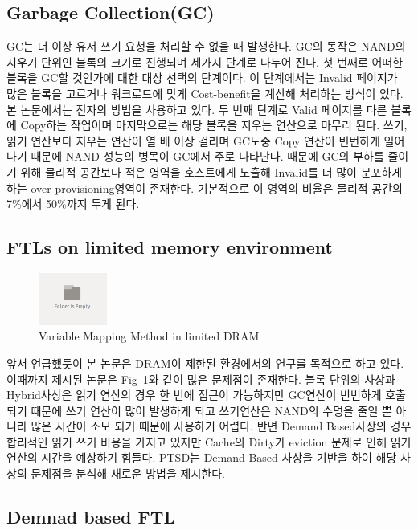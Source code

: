 \documentclass[conference]{IEEEtran}
\begin{document}
\subsection{Garbage Collection(GC)}
GC는 더 이상 유저 쓰기 요청을 처리할 수 없을 때 발생한다. GC의 동작은 NAND의 지우기 단위인 블록의 크기로 진행되며 세가지 단계로 나누어 진다. 첫 번째로 어떠한 블록을 GC할 것인가에 대한 대상 선택의 단계이다. 이 단계에서는 Invalid 페이지가 많은 블록을 고르거나 워크로드에 맞게 Cost-benefit을 계산해 처리하는 방식이 있다. 본 논문에서는 전자의 방법을 사용하고 있다. 두 번째 단계로 Valid 페이지를 다른 블록에 Copy하는 작업이며 마지막으로는 해당 블록을 지우는 연산으로 마무리 된다.
쓰기, 읽기 연산보다 지우는 연산이 열 배 이상 걸리며 GC도중 Copy 연산이 빈번하게 일어나기 때문에 NAND 성능의 병목이 GC에서 주로 나타난다. 때문에 GC의 부하를 줄이기 위해 물리적 공간보다 적은 영역을 호스트에게 노출해 Invalid를 더 많이 분포하게 하는 over provisioning영역이 존재한다. 기본적으로 이 영역의 비율은 물리적 공간의 7\%에서 50\%까지 두게 된다.

\subsection{FTLs on limited memory environment}
\begin{figure}[h]
	\centering
	\includegraphics[width=0.2\textwidth]{image/bg.png}
	\caption{Variable Mapping Method in limited DRAM}
	\label{fig:Map}
\end{figure}
앞서 언급했듯이 본 논문은 DRAM이 제한된 환경에서의 연구를 목적으로 하고 있다. 이때까지 제시된 논문은 Fig~\ref{fig:Map}와 같이 많은 문제점이 존재한다. 블록 단위의 사상과 Hybrid사상은 읽기 연산의 경우 한 번에 접근이 가능하지만 GC연산이 빈번하게 호출되기 때문에 쓰기 연산이 많이 발생하게 되고 쓰기연산은 NAND의 수명을 줄일 뿐 아니라 많은 시간이 소모 되기 때문에 사용하기 어렵다. 반면 Demand Based사상의 경우 합리적인 읽기 쓰기 비용을 가지고 있지만 Cache의 Dirty가 eviction 문제로 인해 읽기 연산의 시간을 예상하기 힘들다. PTSD는 Demand Based 사상을 기반을 하여 해당 사상의 문제점을 분석해 새로운 방법을 제시한다.

\subsection{Demnad based FTL}
\end{document}

